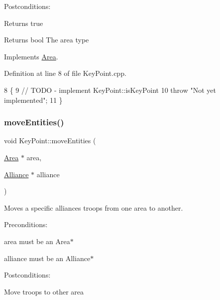 Postconditions\+:
\begin{DoxyItemize}
\item Returns true
\end{DoxyItemize}

\begin{DoxyReturn}{Returns}
bool The area type 
\end{DoxyReturn}


Implements \hyperlink{classArea}{Area}.



Definition at line 8 of file Key\+Point.\+cpp.


\begin{DoxyCode}
8                           \{
9     \textcolor{comment}{// TODO - implement KeyPoint::isKeyPoint}
10     \textcolor{keywordflow}{throw} \textcolor{stringliteral}{"Not yet implemented"};
11 \}
\end{DoxyCode}
\mbox{\label{classKeyPoint_a3fc425554378989ba83ebd22f7305f14}} 
\subsubsection{\texorpdfstring{move\+Entities()}{moveEntities()}}
{\footnotesize\ttfamily void Key\+Point\+::move\+Entities (\begin{DoxyParamCaption}\item[{\hyperlink{classArea}{Area} $\ast$}]{area,  }\item[{\hyperlink{classAlliance}{Alliance} $\ast$}]{alliance }\end{DoxyParamCaption})\hspace{0.3cm}{\ttfamily [virtual]}}



Moves a specific alliances troops from one area to another. 

Preconditions\+:
\begin{DoxyItemize}
\item area must be an Area$\ast$
\end{DoxyItemize}

alliance must be an Alliance$\ast$

Postconditions\+:
\begin{DoxyItemize}
\item Move troops to other area
\end{DoxyItemize}


